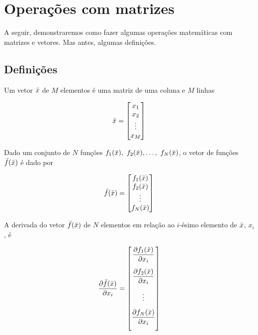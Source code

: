 \chapter{Operações com matrizes}
\label{chap:opmat}

A seguir, demonstraremos como fazer algumas operações matemáticas com matrizes e
vetores.
Mas antes, algumas definições.

\section{Definições}

\begin{define}
    Um vetor $\bar{x}$ de $M$ elementos é uma matriz de uma coluna e $M$ linhas

    \begin{equation}
    \bar{x} =
    \begin{bmatrix}
    x_1 \\ x_2 \\ \vdots \\ x_M
    \end{bmatrix}
    \end{equation}
\end{define}

\begin{define}
    Dado um conjunto de $N$ funções $f_1(\vect{x}),\ f_2(\vect{x}),\dotsc,\ f_N(\vect{x})$,
    o vetor de funções $\bar{f}(\bar{x})$ é dado por

    \begin{equation}
    \bar{f}(\bar{x}) =
    \begin{bmatrix}
    f_1(\bar{x}) \\ f_2(\bar{x}) \\ \vdots \\ f_N(\bar{x})
    \end{bmatrix}
    \end{equation}
\end{define}

\begin{define}
    A derivada do vetor $\bar{f}(\bar{x})$ de $N$ elementos em relação ao
    $i$-ésimo elemento de $\bar{x}$, $x_i$, é

    \begin{equation}
    \dfrac{\partial \vect{f}(\vect{x})}{\partial x_i} =
    \begin{bmatrix}
    \dfrac{\partial f_1(\vect{x})}{\partial x_i} \vspace{0.3cm}\\
    \dfrac{\partial f_2(\vect{x})}{\partial x_i} \vspace{0.3cm}\\
    \vdots \vspace{0.3cm}\\
    \dfrac{\partial f_N(\vect{x})}{\partial x_i} \vspace{0.3cm}\\
    \end{bmatrix}
    \end{equation}
\end{define}

